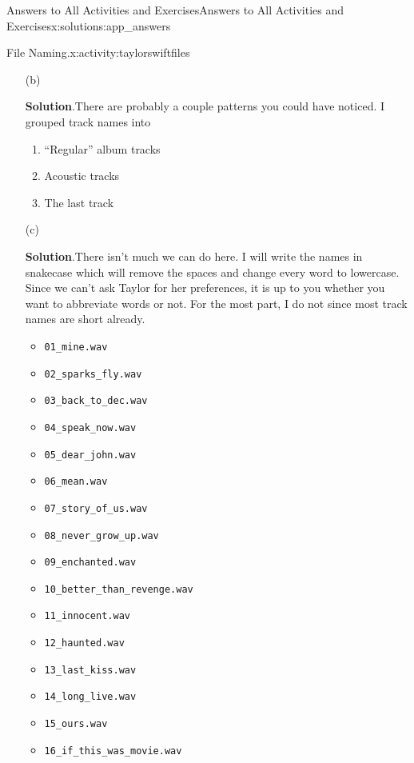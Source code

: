 \documentclass[oneside,10pt,]{book}
\newcommand{\blocktitlefont}{\relax}
\newcommand{\mono}[1]{\texttt{#1}}
\begin{document}
\begin{solutions-chapter}{Answers to All Activities and Exercises}{}{Answers to All Activities and Exercises}{}{}{x:solutions:app_answers}
\begin{activitysolution}{1.2}{File Naming.}{x:activity:taylorswiftfiles}
\begin{enumerate}[font=\bfseries,label=(\alph*),ref=\alph*]
\par
The two here are the main issues; you may have thought of others. Great! I'm sure they are good observations.%
\item[(b)]\par\smallskip%
\noindent\textbf{\blocktitlefont Solution}.\hypertarget{g:solution:idm480948680-back}{}\quad{}There are probably a couple patterns you could have noticed. I grouped track names into%
\begin{enumerate}[label=\arabic*]
\item{}``Regular'' album tracks%
\item{}Acoustic tracks%
\item{}The last track%
\end{enumerate}
%
\item[(c)]\par\smallskip%
\noindent\textbf{\blocktitlefont Solution}.\hypertarget{g:solution:idm480941768-back}{}\quad{}There isn't much we can do here. I will write the names in snake\textunderscore{}case which will remove the spaces and change every word to lowercase. Since we can't ask Taylor for her preferences, it is up to you whether you want to abbreviate words or not. For the most part, I do not since most track names are short already.%
\begin{multicols}{2}
\begin{itemize}[label=\textbullet]
\item{}\mono{01\_mine.wav}%
\item{}\mono{02\_sparks\_fly.wav}%
\item{}\mono{03\_back\_to\_dec.wav}%
\item{}\mono{04\_speak\_now.wav}%
\item{}\mono{05\_dear\_john.wav}%
\item{}\mono{06\_mean.wav}%
\item{}\mono{07\_story\_of\_us.wav}%
\item{}\mono{08\_never\_grow\_up.wav}%
\item{}\mono{09\_enchanted.wav}%
\item{}\mono{10\_better\_than\_revenge.wav}%
\item{}\mono{11\_innocent.wav}%
\item{}\mono{12\_haunted.wav}%
\item{}\mono{13\_last\_kiss.wav}%
\item{}\mono{14\_long\_live.wav}%
\item{}\mono{15\_ours.wav}%
\item{}\mono{16\_if\_this\_was\_movie.wav}%

\end{itemize}
\end{multicols}
\end{enumerate}
\end{activitysolution}
\end{solutions-chapter}
\end{document}
